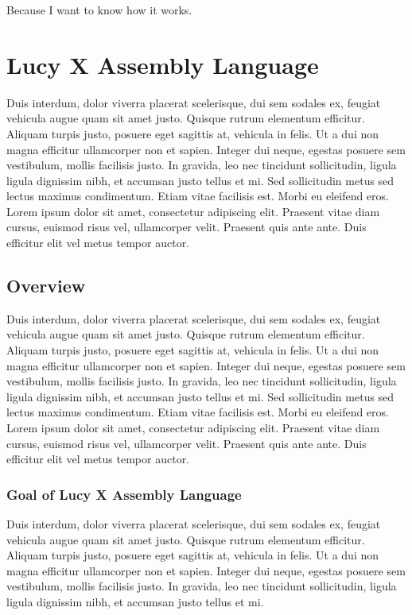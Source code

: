 \begin{savequote}[75mm]
Because I want to know how it works.
\end{savequote}

\chapter{Lucy X Assembly Language}
Duis interdum, dolor viverra placerat scelerisque, dui sem sodales ex, feugiat vehicula augue quam sit amet justo. Quisque rutrum elementum efficitur. Aliquam turpis justo, posuere eget sagittis at, vehicula in felis. Ut a dui non magna efficitur ullamcorper non et sapien. Integer dui neque, egestas posuere sem vestibulum, mollis facilisis justo. In gravida, leo nec tincidunt sollicitudin, ligula ligula dignissim nibh, et accumsan justo tellus et mi. Sed sollicitudin metus sed lectus maximus condimentum. Etiam vitae facilisis est. Morbi eu eleifend eros. Lorem ipsum dolor sit amet, consectetur adipiscing elit. Praesent vitae diam cursus, euismod risus vel, ullamcorper velit. Praesent quis ante ante. Duis efficitur elit vel metus tempor auctor.

\section{Overview}
Duis interdum, dolor viverra placerat scelerisque, dui sem sodales ex, feugiat vehicula augue quam sit amet justo. Quisque rutrum elementum efficitur. Aliquam turpis justo, posuere eget sagittis at, vehicula in felis. Ut a dui non magna efficitur ullamcorper non et sapien. Integer dui neque, egestas posuere sem vestibulum, mollis facilisis justo. In gravida, leo nec tincidunt sollicitudin, ligula ligula dignissim nibh, et accumsan justo tellus et mi. Sed sollicitudin metus sed lectus maximus condimentum. Etiam vitae facilisis est. Morbi eu eleifend eros. Lorem ipsum dolor sit amet, consectetur adipiscing elit. Praesent vitae diam cursus, euismod risus vel, ullamcorper velit. Praesent quis ante ante. Duis efficitur elit vel metus tempor auctor.

\subsection{Goal of Lucy X Assembly Language}
Duis interdum, dolor viverra placerat scelerisque, dui sem sodales ex, feugiat vehicula augue quam sit amet justo. Quisque rutrum elementum efficitur. Aliquam turpis justo, posuere eget sagittis at, vehicula in felis. Ut a dui non magna efficitur ullamcorper non et sapien. Integer dui neque, egestas posuere sem vestibulum, mollis facilisis justo. In gravida, leo nec tincidunt sollicitudin, ligula ligula dignissim nibh, et accumsan justo tellus et mi.

